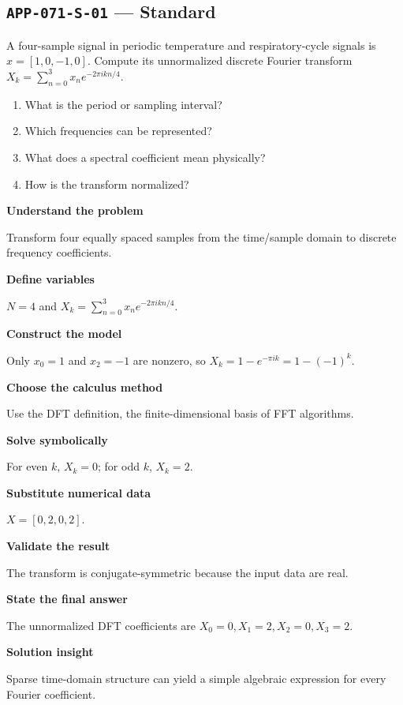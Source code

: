 \documentclass[11pt]{book}
\newcommand{\pid}[1]{\texttt{#1}}
\begin{document}
\subsection*{\pid{APP-071-S-01} — Standard}
\begin{problembox}
A four-sample signal in periodic temperature and respiratory-cycle signals is $x=[1,0,-1,0]$. Compute its unnormalized discrete Fourier transform $X_k=\sum_{n=0}^3 x_ne^{-2\pi i kn/4}$.
\end{problembox}
\begin{promptbox}\begin{enumerate}
\item What is the period or sampling interval?
\item Which frequencies can be represented?
\item What does a spectral coefficient mean physically?
\item How is the transform normalized?
\end{enumerate}\end{promptbox}
\begin{solutionbox}
\textbf{Understand the problem}\par Transform four equally spaced samples from the time/sample domain to discrete frequency coefficients.\par\medskip
\textbf{Define variables}\par $N=4$ and $X_k=\sum_{n=0}^{3}x_n e^{-2\pi i kn/4}$.\par\medskip
\textbf{Construct the model}\par Only $x_0=1$ and $x_2=-1$ are nonzero, so $X_k=1-e^{-\pi i k}=1-(-1)^k$.\par\medskip
\textbf{Choose the calculus method}\par Use the DFT definition, the finite-dimensional basis of FFT algorithms.\par\medskip
\textbf{Solve symbolically}\par For even $k$, $X_k=0$; for odd $k$, $X_k=2$.\par\medskip
\textbf{Substitute numerical data}\par $X=[0,2,0,2]$.\par\medskip
\textbf{Validate the result}\par The transform is conjugate-symmetric because the input data are real.\par\medskip
\textbf{State the final answer}\par The unnormalized DFT coefficients are $X_0=0,X_1=2,X_2=0,X_3=2$.\par\medskip
\textbf{Solution insight}\par Sparse time-domain structure can yield a simple algebraic expression for every Fourier coefficient.\par\medskip
\end{solutionbox}
\end{document}
